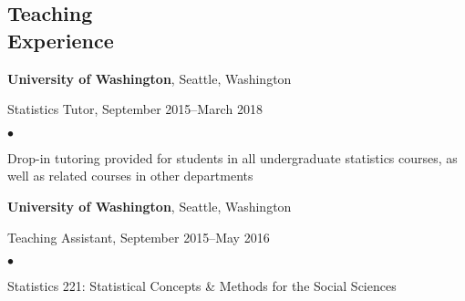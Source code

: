 \documentclass[margin,centered]{res}
\newenvironment{list1}{
  \begin{list}{\ding{113}}{%
      \setlength{\itemsep}{0in}
      \setlength{\parsep}{0in} \setlength{\parskip}{0in}
      \setlength{\topsep}{0in} \setlength{\partopsep}{0in}
      \setlength{\leftmargin}{0.17in}}}{\end{list}}
\newenvironment{list2}{
  \begin{list}{$\bullet$}{%
      \setlength{\itemsep}{0in}
      \setlength{\parsep}{0in} \setlength{\parskip}{0in}
      \setlength{\topsep}{0in} \setlength{\partopsep}{0in}
      \setlength{\leftmargin}{0.2in}}}{\end{list}}
\begin{document}
\begin{resume}
\begin{comment}
{\bf MN2020}, St. Paul, Minnesota
\begin{list1}
\item[] 
Education Research Fellow, January 2013--February 2013
\begin{list2}
\vspace*{.05in}
\item Analyzed local, state, and national education policy through the lens of racial and socioeconomic equity
\item Composed reports evaluating current policy and advocating for policy change
\item Published policy reports to various social media outlets with over 47,000 subscribers
\item Gathered and cleaned data for project to evaluate charter school funding and outcomes
\end{list2}
\end{list1}
\end{comment}

\section{\sc Teaching \\ Experience}

{\bf University of Washington}, Seattle, Washington
\begin{list1}
\item[] Statistics Tutor, September 2015--March 2018
\begin{list2}
\vspace*{.05in}
\item Drop-in tutoring provided for students in all undergraduate statistics courses, as well as related courses in other departments
\end{list2}
\end{list1}

{\bf University of Washington}, Seattle, Washington
\begin{list1}
\item[] Teaching Assistant, September 2015--May 2016
\begin{list2}
\vspace*{.05in}
\item Statistics 221: Statistical Concepts \& Methods for the Social Sciences
\end{list2}
\end{list1}



\end{resume}
\end{document}
